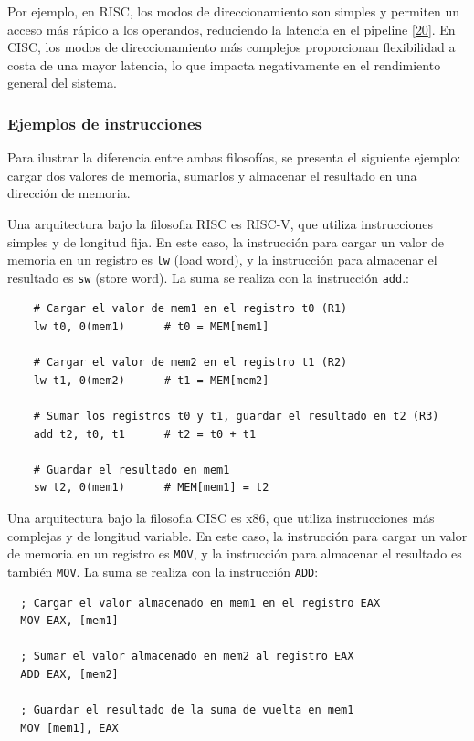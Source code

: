 \documentclass[12pt,oneside]{templates/unerthesis}
\begin{document}
Por ejemplo, en RISC, los modos de direccionamiento son simples y permiten un acceso más rápido a los operandos, reduciendo la latencia en el pipeline \protect\hyperlink{ref-stallings_computer_2021}{{[}20{]}}. En CISC, los modos de direccionamiento más complejos proporcionan flexibilidad a costa de una mayor latencia, lo que impacta negativamente en el rendimiento general del sistema.

\hypertarget{ejemplos-de-instrucciones}{%
\subsubsection{Ejemplos de instrucciones}\label{ejemplos-de-instrucciones}}

Para ilustrar la diferencia entre ambas filosofías, se presenta el siguiente ejemplo: cargar dos valores de memoria, sumarlos y almacenar el resultado en una dirección de memoria.

Una arquitectura bajo la filosofia RISC es RISC-V, que utiliza instrucciones simples y de longitud fija. En este caso, la instrucción para cargar un valor de memoria en un registro es \texttt{lw} (load word), y la instrucción para almacenar el resultado es \texttt{sw} (store word). La suma se realiza con la instrucción \texttt{add}.:

\begin{lstlisting}
    # Cargar el valor de mem1 en el registro t0 (R1)
    lw t0, 0(mem1)      # t0 = MEM[mem1]

    # Cargar el valor de mem2 en el registro t1 (R2)
    lw t1, 0(mem2)      # t1 = MEM[mem2]

    # Sumar los registros t0 y t1, guardar el resultado en t2 (R3)
    add t2, t0, t1      # t2 = t0 + t1

    # Guardar el resultado en mem1
    sw t2, 0(mem1)      # MEM[mem1] = t2
  \end{lstlisting}

Una arquitectura bajo la filosofia CISC es x86, que utiliza instrucciones más complejas y de longitud variable. En este caso, la instrucción para cargar un valor de memoria en un registro es \texttt{MOV}, y la instrucción para almacenar el resultado es también \texttt{MOV}. La suma se realiza con la instrucción \texttt{ADD}:

\begin{lstlisting}
  ; Cargar el valor almacenado en mem1 en el registro EAX
  MOV EAX, [mem1]

  ; Sumar el valor almacenado en mem2 al registro EAX
  ADD EAX, [mem2]

  ; Guardar el resultado de la suma de vuelta en mem1
  MOV [mem1], EAX
  \end{lstlisting}
\end{document}
